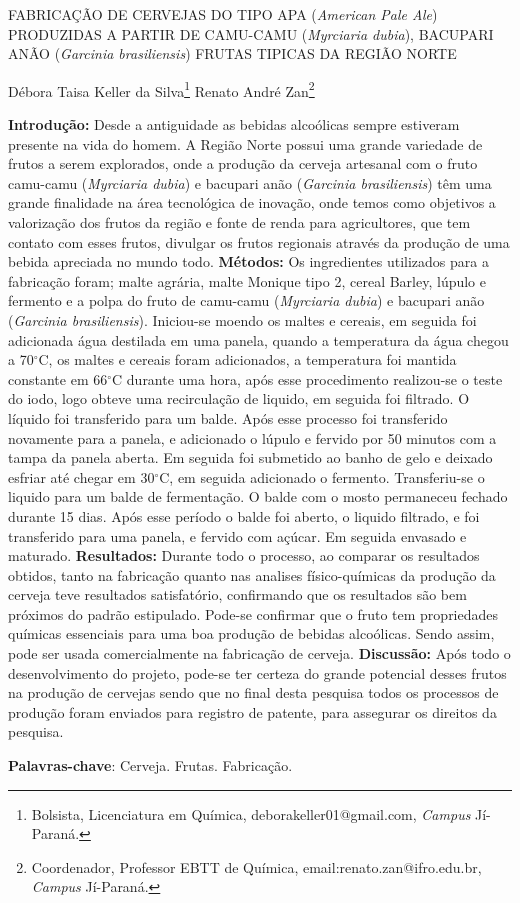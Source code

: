 \documentclass[article,12pt,onesidea,4paper,english,brazil]{abntex2}
\begin{document}
	
	
	\frenchspacing 
	
	\begin{center}
		\LARGE FABRICAÇÃO DE CERVEJAS DO TIPO APA (\textit{American Pale Ale}) PRODUZIDAS
		A PARTIR DE CAMU-CAMU (\textit{Myrciaria dubia}), BACUPARI ANÃO (\textit{Garcinia
		brasiliensis}) FRUTAS TIPICAS DA REGIÃO NORTE
		
		\normalsize
		Débora Taisa Keller da Silva\footnote{Bolsista, Licenciatura em Química, deborakeller01@gmail.com, \textit{Campus} Jí-Paraná.} 
		Renato André Zan\footnote{Coordenador, Professor EBTT de Química, email:renato.zan@ifro.edu.br, \textit{Campus} Jí-Paraná.}
	\end{center}
	
	\noindent \textbf{Introdução:} Desde a antiguidade as bebidas alcoólicas sempre estiveram presente na vida do homem. A Região Norte possui uma grande variedade de frutos a serem
	explorados, onde a produção da cerveja artesanal com o fruto camu-camu (\textit{Myrciaria
	dubia}) e bacupari anão (\textit{Garcinia brasiliensis}) têm uma grande finalidade na área
	tecnológica de inovação, onde temos como objetivos a valorização dos frutos da
	região e fonte de renda para agricultores, que tem contato com esses frutos, divulgar
	os frutos regionais através da produção de uma bebida apreciada no mundo todo.
	\textbf{Métodos:} Os ingredientes utilizados para a fabricação foram; malte agrária, malte
	Monique tipo 2, cereal Barley, lúpulo e fermento e a polpa do fruto de camu-camu
	(\textit{Myrciaria dubia}) e bacupari anão (\textit{Garcinia brasiliensis}). Iniciou-se moendo os maltes e cereais, em seguida foi adicionada água destilada em uma panela, quando
	a temperatura da água chegou a 70$^\circ$C, os maltes e cereais foram adicionados, a
	temperatura foi mantida constante em 66$^\circ$C durante uma hora, após esse
	procedimento realizou-se o teste do iodo, logo obteve uma recirculação de liquido,
	em seguida foi filtrado. O líquido foi transferido para um balde. Após esse processo
	foi transferido novamente para a panela, e adicionado o lúpulo e fervido por 50
	minutos com a tampa da panela aberta. Em seguida foi submetido ao banho de gelo
	e deixado esfriar até chegar em 30$^\circ$C, em seguida adicionado o fermento.
	Transferiu-se o liquido para um balde de fermentação. O balde com o mosto
	permaneceu fechado durante 15 dias. Após esse período o balde foi aberto, o liquido
	filtrado, e foi transferido para uma panela, e fervido com açúcar. Em seguida
	envasado e maturado. \textbf{Resultados:} Durante todo o processo, ao comparar os
	resultados obtidos, tanto na fabricação quanto nas analises físico-químicas da
	produção da cerveja teve resultados satisfatório, confirmando que os resultados são
	bem próximos do padrão estipulado. Pode-se confirmar que o fruto tem propriedades
	químicas essenciais para uma boa produção de bebidas alcoólicas. Sendo assim,
	pode ser usada comercialmente na fabricação de cerveja. \textbf{Discussão:} Após todo o
	desenvolvimento do projeto, pode-se ter certeza do grande potencial desses frutos
	na produção de cervejas sendo que no final desta pesquisa todos os processos de
	produção foram enviados para registro de patente, para assegurar os direitos da
	pesquisa.
	
	\vspace{\onelineskip}
	
	\noindent
	\textbf{Palavras-chave}: Cerveja. Frutas. Fabricação.
	
\end{document}
